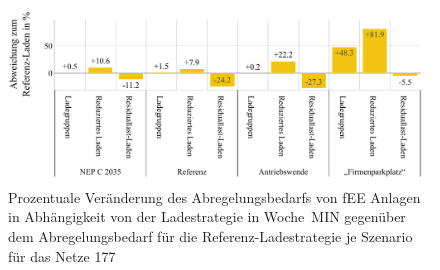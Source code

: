 \begin{figure}[H]
    \centering
    \includegraphics[width=\textwidth]{Bilder/177_cur_fee_grid_week_A}
    \caption{Prozentuale Veränderung des Abregelungsbedarfs von fEE Anlagen in Abhängigkeit von der Ladestrategie in Woche~MIN gegenüber dem Abregelungsbedarf für die Referenz-Ladestrategie je Szenario für das Netze \num{177}}\label{fig:177_cur_fee_grid_week_A}
\end{figure}